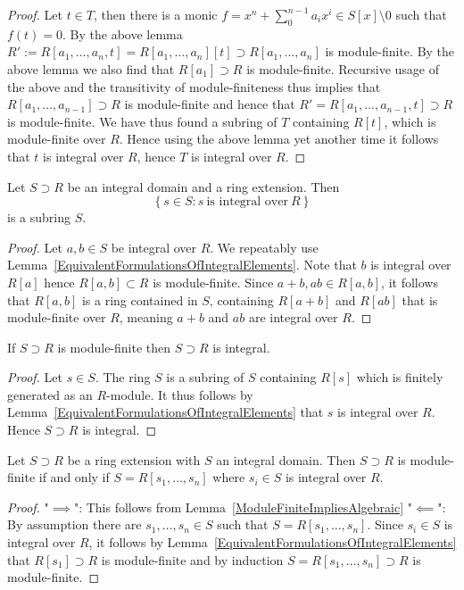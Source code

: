 \begin{proof}
    Let $t\in T$, then there is a monic $f=x^n+\sum_0^{n-1} a_ix^i\in S[x]\setminus 0$ such that $f(t)=0$. By the above lemma $R' := R[a_1,\dots,a_n,t]=R[a_1,\dots,a_n][t] \supset R[a_1,\dots,a_n]$ is module-finite. By the above lemma we also find that $R[a_1]\supset R$ is module-finite. Recursive usage of the above and the transitivity of module-finiteness thus implies that $R[a_1,\dots,a_{n-1}]\supset R$ is module-finite and hence that $R' = R[a_1,\dots,a_{n-1},t]\supset R$ is module-finite. We have thus found a subring of $T$ containing $R[t]$, which is module-finite over $R$. Hence using the above lemma yet another time it follows that $t$ is integral over $R$, hence $T$ is integral over $R$. 
\end{proof}
\begin{proposition}\label{IntegralElementsIsSubring}
    Let $S\supset R$ be an integral domain and a ring extension. Then 
    $$\left\{ s\in S : s \ \text{is integral over} \ R\right\}$$
    is a subring $S$.
\end{proposition}
\begin{proof}
    Let $a,b\in S$ be integral over $R$. We repeatably use Lemma~\ref{EquivalentFormulationsOfIntegralElements}. Note that $b$ is integral over $R[a]$ hence $R[a,b]\subset R$ is module-finite. Since $a + b, ab\in R[a,b]$, it follows that $R[a,b]$ is a ring contained in $S$, containing $R[a+b]$ and $R[ab]$ that is module-finite over $R$, meaning $a+b$ and $ab$ are integral over $R$. 
\end{proof}
\begin{lemma}\label{ModuleFiniteImpliesAlgebraic}
    If $S\supset R$ is module-finite then $S\supset R$ is integral. 
\end{lemma}
\begin{proof}
    Let $s\in S$. The ring $S$ is a subring of $S$ containing $R[s]$ which is finitely generated as an $R$-module. It thus follows by Lemma~\ref{EquivalentFormulationsOfIntegralElements} that $s$ is integral over $R$. Hence $S\supset R$ is integral.
\end{proof}
\begin{lemma}\label{ForRingFiniteExtensionsModuleFiniteIsTheSameAsAlgebraic}
    Let $S\supset R$ be a ring extension with $S$ an integral domain. Then $S\supset R$ is module-finite if and only if $S=R[s_1,\dots,s_n]$ where $s_i\in S$ is integral over $R$. 
\end{lemma}
\begin{proof}
    "$\implies$": This follows from Lemma~\ref{ModuleFiniteImpliesAlgebraic}
    "$\impliedby$": By assumption there are $s_1,\dots,s_n\in S$ such that $S = R[s_1,\dots,s_n]$. Since $s_i\in S$ is integral over $R$, it follows by Lemma~\ref{EquivalentFormulationsOfIntegralElements} that $R[s_1] \supset R$ is module-finite and by induction $S=R[s_1,\dots,s_n]\supset R$ is module-finite. 
\end{proof}
